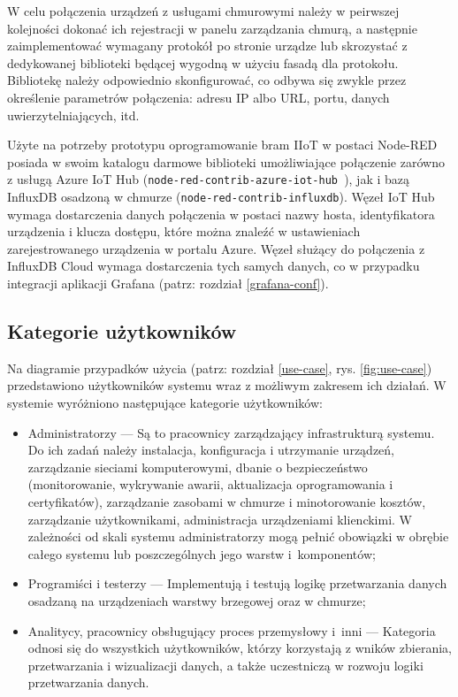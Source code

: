 \documentclass[a4paper, 12pt, twoside]{article}
\begin{document}
W celu połączenia urządzeń z usługami chmurowymi należy w peirwszej kolejności
dokonać ich rejestracji w panelu zarządzania chmurą, a następnie zaimplementować
wymagany protokół po stronie urządze lub skrozystać z dedykowanej biblioteki
będącej wygodną w użyciu fasadą dla protokołu. Bibliotekę należy odpowiednio 
skonfigurować, co odbywa się zwykle przez określenie parametrów połączenia:
adresu IP albo URL, portu, danych uwierzytelniających, itd.

Użyte na potrzeby prototypu oprogramowanie bram IIoT w postaci Node-RED 
posiada w swoim katalogu darmowe biblioteki umożliwiające połączenie zarówno z usługą
Azure IoT Hub (\texttt{node-red-contrib-azure-iot-hub }), 
jak i bazą InfluxDB osadzoną w chmurze (\texttt{node-red-contrib-influxdb}). 
Węzeł IoT Hub wymaga dostarczenia danych połączenia w postaci nazwy hosta, 
identyfikatora urządzenia i klucza dostępu, które można znaleźć w ustawieniach
zarejestrowanego urządzenia w portalu Azure. Węzeł służący do połączenia z 
InfluxDB Cloud wymaga dostarczenia tych samych danych, co w przypadku integracji
aplikacji Grafana (patrz: rozdział \ref{grafana-conf}).

\subsection{Kategorie użytkowników}

Na diagramie przypadków użycia (patrz: rozdział \ref{use-case}, rys. \ref{fig:use-case})
przedstawiono użytkowników systemu wraz z możliwym zakresem ich działań.
W systemie wyróżniono następujące kategorie użytkowników:
\begin{itemize}
      \itemsep0em
      \item Administratorzy --- Są to pracownicy zarządzający infrastrukturą systemu.
      Do ich zadań należy instalacja, konfiguracja i utrzymanie urządzeń,
      zarządzanie sieciami komputerowymi, dbanie o bezpieczeństwo (monitorowanie, 
      wykrywanie awarii, aktualizacja oprogramowania i certyfikatów),  zarządzanie zasobami w chmurze
      i minotorowanie kosztów, zarządzanie użytkownikami, administracja urządzeniami klienckimi.
      W zależności od skali systemu administratorzy mogą pełnić obowiązki 
      w obrębie całego systemu lub poszczególnych jego warstw i~komponentów;
      \item Programiści i testerzy --- Implementują i testują logikę przetwarzania
      danych osadzaną na urządzeniach warstwy brzegowej oraz w chmurze;
      \item Analitycy, pracownicy obsługujący proces przemysłowy i~inni ---
      Kategoria odnosi się do wszystkich użytkowników, którzy korzystają z wników zbierania, przetwarzania
      i wizualizacji danych, a także uczestniczą w rozwoju logiki przetwarzania danych. 
\end{itemize} 
\end{document}
